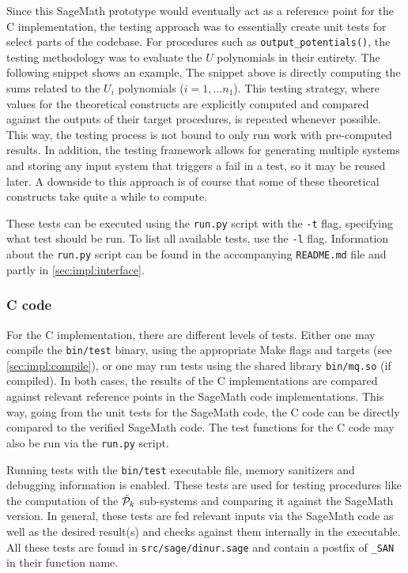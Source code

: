 Since this SageMath prototype would eventually act as a reference point for the C implementation, the testing approach was to essentially create unit tests for select parts of the codebase. For procedures such as \texttt{output\_potentials()}, the testing methodology was to evaluate the $U$ polynomials in their entirety. The following snippet shows an example,
The snippet above is directly computing the sums related to the $U_i$ polynomials ($i = 1, \dots n_1$). This testing strategy, where values for the theoretical constructs are explicitly computed and compared against the outputs of their target procedures, is repeated whenever possible. This way, the testing process is not bound to only run work with pre-computed results. In addition, the testing framework allows for generating multiple systems and storing any input system that triggers a fail in a test, so it may be reused later. A downside to this approach is of course that some of these theoretical constructs take quite a while to compute.

These tests can be executed using the \texttt{run.py} script with the \texttt{-t} flag, specifying what test should be run. To list all available tests, use the \texttt{-l} flag. Information about the \texttt{run.py} script can be found in the accompanying \texttt{README.md} file and partly in \cref{sec:impl:interface}.

\subsubsection{C code}

For the C implementation, there are different levels of tests. Either one may compile the \texttt{bin/test} binary, using the appropriate Make flags and targets (see \cref{sec:impl:compile}), or one may run tests using the shared library \texttt{bin/mq.so} (if compiled). In both cases, the results of the C implementations are compared against relevant reference points in the SageMath code implementations. This way, going from the unit tests for the SageMath code, the C code can be directly compared to the verified SageMath code. The test functions for the C code may also be run via the \texttt{run.py} script.

Running tests with the \texttt{bin/test} executable file, memory sanitizers and debugging information is enabled. These tests are used for testing procedures like the computation of the $\Tilde{\mathcal{P}}_k$ sub-systems and comparing it against the SageMath version. In general, these tests are fed relevant inputs via the SageMath code as well as the desired result(s) and checks against them internally in the executable. All these tests are found in \texttt{src/sage/dinur.sage} and contain a postfix of \texttt{\_SAN} in their function name.

